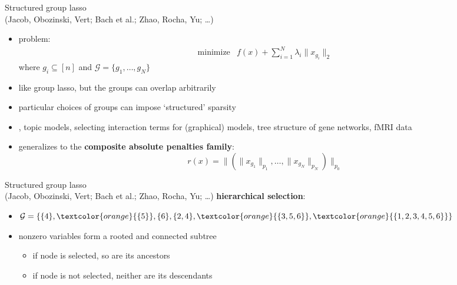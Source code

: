 \documentclass[10pt,mathserif]{beamer}
\begin{document}
\begin{frame}{Structured group lasso \\[-0.3em] 
{\footnotesize \textmd{(Jacob, Obozinski, Vert; Bach et al.; Zhao, Rocha, Yu; \dots)}}}
\begin{itemize}\itemsep=12pt
\item problem:
\[
\begin{array}{ll}
\mbox{minimize} & f(x) + \sum_{i=1}^N \lambda_i \|x_{g_i}\|_2
\end{array}
\]
where $g_i \subseteq [n]$ and $\mathcal G = \{g_1, \dots, g_N\}$
\item like group lasso, but the groups can overlap arbitrarily
\item particular choices of groups can impose `structured' sparsity
\item \eg, topic models, selecting interaction terms for (graphical) models,
    tree structure of gene networks, fMRI data
\item generalizes to the \textbf{composite absolute penalties family}:
\[
r(x) = \|(\|x_{g_1}\|_{p_1}, \dots, \|x_{g_N}\|_{p_N})\|_{p_0}
\]
\end{itemize}
\end{frame}

\begin{frame}{Structured group lasso \\[-0.3em] 
{\footnotesize \textmd{(Jacob, Obozinski, Vert; Bach et al.; Zhao, Rocha, Yu; \dots)}}}
\textbf{hierarchical selection}:
\begin{center}
\end{center}
\begin{itemize}\itemsep=8pt
    \item $\mathcal G = \{ \{4\}, \textcolor{orange}{\{5\}}, \{6\}, \{2,4\}, 
        \textcolor{orange}{\{3,5,6\}}, \textcolor{orange}{\{1,2,3,4,5,6\} \}}$
\item nonzero variables form a rooted and connected subtree
    \begin{itemize}
        \item if node is selected, so are its ancestors
        \item if node is not selected, neither are its descendants
    \end{itemize}
\end{itemize}
\end{frame}
\end{document}
